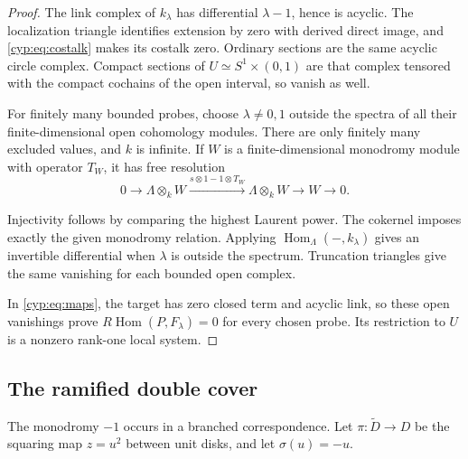 \begin{proof}
The link complex of \(k_\lambda\) has differential
\(\lambda-1\), hence is acyclic. The localization triangle
identifies extension by zero with derived direct image,
and \eqref{cyp:eq:costalk} makes its costalk zero.
Ordinary sections are the same acyclic circle complex.
Compact sections of \(U\simeq S^1\times(0,1)\) are
that complex tensored with the compact cochains of the
open interval, so vanish as well.

For finitely many bounded probes, choose \(\lambda\ne0,1\)
outside the spectra of all their finite-dimensional open
cohomology modules. There are only finitely many excluded
values, and \(k\) is infinite. If \(W\) is a finite-dimensional
monodromy module with operator \(T_W\), it has free resolution
\[
 0\longrightarrow\Lambda\otimes_k W
 \xrightarrow{s\otimes1-1\otimes T_W}\Lambda\otimes_k W
 \longrightarrow W\longrightarrow0.
\]

Injectivity follows by comparing the highest Laurent power.
The cokernel imposes exactly the given monodromy relation.
Applying \(\operatorname{Hom}_{\Lambda}(-,k_\lambda)\)
gives an invertible differential when \(\lambda\) is outside
the spectrum. Truncation triangles give the same vanishing
for each bounded open complex.

In \eqref{cyp:eq:maps},
the target has zero closed term and acyclic link, so these
open vanishings prove \(R\operatorname{Hom}(P,F_\lambda)=0\)
for every chosen probe. Its restriction to \(U\) is a
nonzero rank-one local system.
\end{proof}

\subsection{The ramified double cover}

The monodromy \(-1\) occurs in a branched correspondence.
Let \(\pi:\widetilde D\to D\) be the squaring map
\(z=u^2\) between unit disks, and let \(\sigma(u)=-u\).

